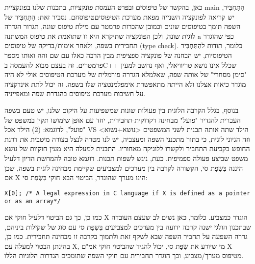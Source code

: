       כאן, בהקשר של טיפוסים ובפרט העמסת פונקציות, בתכנות שלנו בפונקציית main הַתַּחְבִּיר,
      יש קריאה לפונקציה השנייה מפאת מערכת הטיפוסיםטיפוסחם. נסביר זאת: הַתַּחְבִּיר של השפה
      תומך בטיפוסים שונים וכמובן שהכרזת פרמטר עם מילת טיפוס שונה, תגרור הגדרה לוגית
      שונה, ולכן הפונקציה שתיקרא היא זו שתואמת את טיפוס המשתנה a כפי שהוגדר תחבירית
      בשפה, ולאחר אימות/בדיקה של טיפוסים (type check). כלומר, תודות להַתַּחְבִּיר
      הטיפוסיות, יש הבחנה של פונקציה ספציפית מבין הרבה כאלו עם שם זהה ואותו מספר
      פרמטרים. זה בעצם מבוא להעמסה בC++ שכלל אינו נושא טריוויאלי, ואף נחשב למעין
      "סימן מסחרי" של אותה שפה, שאלמלא הגדרה פורמלית של מערכת הטיפוסים אולי לא היה
      מוגדר כיאות אצלנו ולא הייתה מתאפשרת אימפלמנטציה שלו בשפה. זה יכול לתת אינדקציה
      על חשיבות מערכת טיפוסים בהגדרת שפה ומאפייניה.

      בנוסף, בגלל הקרבה הלוגית בין פעולות שונות שמשפיעות על היקום שלנו, יש טעם בשפה
      העברית להגדיר "פועל" מבחינה דקדוקית-תחבירית, יחד עם אופן שימושו תקין במשפט של
      "פועל", לדוגמא: (2) הילד אכל VS הילד שתה
      אותה תבנית לשני המשפטים <נושא+נשוא> וזה הגיוני לוגית, כי בתור מתכנני השפה ומעצביה, יש לנו מטרה לנצל בצורה מיטבית את דרגת החופש בקביעת התחביר ולקשרו ללוגיקה מאחוריו. התבנית למעלה היא מעין חוקיות של נושא משפט שביצע פעולה ספמיפית.
      כעת, ניגש לשפות תכנות.
      דוגמא טובה להמחשת הדיון דלעיל היננה בִּשְׂפַת סי, הקשורה לקרבה בין מערכים למצביעים שקיימת מבחינה לוגית בשפה, שכן אם X הינו מערך שהוגדר, הביטוי הבא חוקי בִּשְׂפַת סי:

\begin{verbatim}
X[0]; /* A legal expression in C language if X is defined as a pointer or as an array*/
\end{verbatim}

      כמו כן, כך גם הביטוי דלעיל חוקי אם X הוגדר כמצביע. כלומר, כאן נשים לב שעצם
      העובדה שבתכנון הולגי ישנה קרבה ידועה בין מערכים למצביעים בִּשְׂפַת סי עם סוג של
      שקילות ביניהם, גררה השפעה על תחביר השפה שבא לשקף זאת ולתמוך בקרבה זו מבחינה
      תחבירית. כמו כן, בהינתן הבטוי למעלה עם X, מי שיודע את שְׂפַת סי, יכול להגיד
      שהביטוי חוקי אמ"ם X מטיפוס מערך/מצביע, וכך הוגדר תחבירית עם חוקי השפה שתומכים
      הגדרות הלוגיות הללו.

